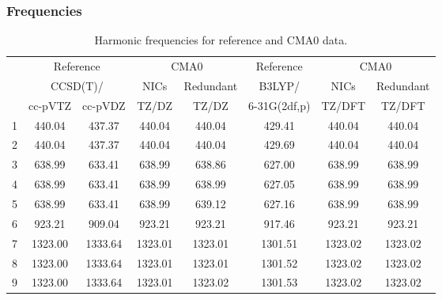 \documentclass[10pt,oneside]{article}
\begin{document}
\begin{table}[h!]
\subsubsection*{Frequencies}
\centering
\caption{Harmonic frequencies for reference and CMA0 data.}
\begin{tabular}{cccccccc}
\toprule
{} & \multicolumn{2}{c}{Reference} & \multicolumn{2}{c}{CMA0} &    Reference & \multicolumn{2}{c}{CMA0} \\
{} & \multicolumn{2}{c}{CCSD(T)/} &    NICs &  Redundant &       B3LYP/ &    NICs & Redundant \\
{} &   cc-pVTZ & cc-pVDZ &   TZ/DZ &      TZ/DZ & 6-31G(2df,p) &  TZ/DFT &    TZ/DFT \\
\midrule
1 &    440.04 &  437.37 &  440.04 &     440.04 &       429.41 &  440.04 &    440.04 \\
2 &    440.04 &  437.37 &  440.04 &     440.04 &       429.69 &  440.04 &    440.04 \\
3 &    638.99 &  633.41 &  638.99 &     638.86 &       627.00 &  638.99 &    638.99 \\
4 &    638.99 &  633.41 &  638.99 &     638.99 &       627.05 &  638.99 &    638.99 \\
5 &    638.99 &  633.41 &  638.99 &     639.12 &       627.16 &  638.99 &    638.99 \\
6 &    923.21 &  909.04 &  923.21 &     923.21 &       917.46 &  923.21 &    923.21 \\
7 &   1323.00 & 1333.64 & 1323.01 &    1323.01 &      1301.51 & 1323.02 &   1323.02 \\
8 &   1323.00 & 1333.64 & 1323.01 &    1323.01 &      1301.52 & 1323.02 &   1323.02 \\
9 &   1323.00 & 1333.64 & 1323.01 &    1323.02 &      1301.53 & 1323.02 &   1323.02 \\
\bottomrule
\end{tabular}
\end{table}
\end{document}
